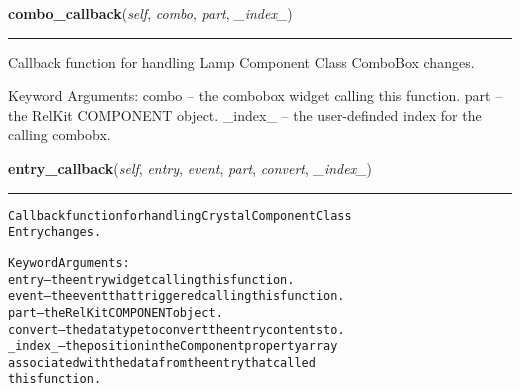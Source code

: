     \label{reliafree:miscellaneous:lamp:Lamp:combo_callback}

    \vspace{0.5ex}

\hspace{.8\funcindent}\begin{boxedminipage}{\funcwidth}

    \raggedright \textbf{combo\_callback}(\textit{self}, \textit{combo}, \textit{part}, \textit{\_index\_})

    \vspace{-1.5ex}

    \rule{\textwidth}{0.5\fboxrule}
\setlength{\parskip}{2ex}
    Callback function for handling Lamp Component Class ComboBox changes.

    Keyword Arguments: combo   -- the combobox widget calling this 
    function. part    -- the RelKit COMPONENT object. \_index\_ -- the 
    user-definded index for the calling combobx.

\setlength{\parskip}{1ex}
    \end{boxedminipage}

    \label{reliafree:miscellaneous:lamp:Lamp:entry_callback}

    \vspace{0.5ex}

\hspace{.8\funcindent}\begin{boxedminipage}{\funcwidth}

    \raggedright \textbf{entry\_callback}(\textit{self}, \textit{entry}, \textit{event}, \textit{part}, \textit{convert}, \textit{\_index\_})

    \vspace{-1.5ex}

    \rule{\textwidth}{0.5\fboxrule}
\setlength{\parskip}{2ex}
\begin{alltt}
Callback function for handling Crystal Component Class
Entry changes.

Keyword Arguments:
entry   -- the entry widget calling this function.
event   -- the event that triggered calling this function.
part    -- the RelKit COMPONENT object.
convert -- the data type to convert the entry contents to.
\_index\_ -- the position in the Component property array
           associated with the data from the entry that called
           this function.
\end{alltt}

\setlength{\parskip}{1ex}
    \end{boxedminipage}

